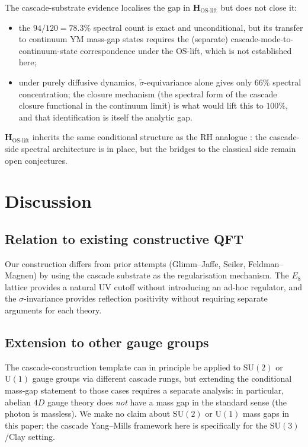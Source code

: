 \documentclass[11pt, a4paper]{amsart}
\theoremstyle{definition}
\begin{document}
The cascade-substrate evidence localises the gap in
$\mathbf{H_{\mathrm{OS\text{-}lift}}}$ but does not close it:
\begin{itemize}
\item the $94/120 = 78.3\%$ spectral count is exact and
unconditional, but its transfer to continuum YM mass-gap states
requires the (separate) cascade-mode-to-continuum-state
correspondence under the OS-lift, which is not established here;
\item under purely diffusive dynamics, $\widetilde\sigma$-equivariance
alone gives only $66\%$ spectral concentration; the closure
mechanism (the spectral form of the cascade closure functional in
the continuum limit) is what would lift this to $100\%$, and that
identification is itself the analytic gap.
\end{itemize}
$\mathbf{H_{\mathrm{OS\text{-}lift}}}$ inherits the same conditional
structure as the RH analogue
\cite[Remark rmk:strengthened]{CascadeRHformal}: the cascade-side
spectral architecture is in place, but the bridges to the classical
side remain open conjectures.

\section{Discussion}

\subsection{Relation to existing constructive QFT}

Our construction differs from prior attempts (Glimm--Jaffe, Seiler,
Feldman--Magnen) by using the cascade substrate as the regularisation
mechanism. The $E_8$ lattice provides a natural UV cutoff without
introducing an ad-hoc regulator, and the $\sigma$-invariance provides
reflection positivity without requiring separate arguments for each
theory.

\subsection{Extension to other gauge groups}

The cascade-construction template can in principle be applied to
$\mathrm{SU}(2)$ or $\mathrm{U}(1)$ gauge groups via different
cascade rungs, but extending the conditional mass-gap statement to
those cases requires a separate analysis: in particular, abelian
$4D$ gauge theory does \emph{not} have a mass gap in the standard
sense (the photon is massless). We make no claim about
$\mathrm{SU}(2)$ or $\mathrm{U}(1)$ mass gaps in this paper; the
cascade Yang--Mills framework here is specifically for the
$\mathrm{SU}(3)$/Clay setting.
\end{document}
